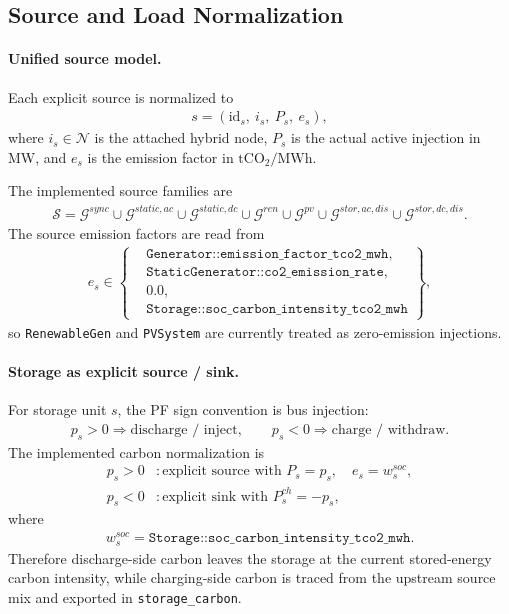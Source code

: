 \subsection{Source and Load Normalization}

\paragraph{Unified source model.}
Each explicit source is normalized to
\begin{align}
s = \left(\mathrm{id}_s,\ i_s,\ P_s,\ e_s\right),
\end{align}
where \(i_s \in \mathcal{N}\) is the attached hybrid node, \(P_s\) is the
actual active injection in MW, and \(e_s\) is the emission factor in
\(\mathrm{tCO_2/MWh}\).

The implemented source families are
\begin{align}
\mathcal{S} =
\mathcal{G}^{sync}
\cup \mathcal{G}^{static,ac}
\cup \mathcal{G}^{static,dc}
\cup \mathcal{G}^{ren}
\cup \mathcal{G}^{pv}
\cup \mathcal{G}^{stor,ac,dis}
\cup \mathcal{G}^{stor,dc,dis}.
\end{align}
The source emission factors are read from
\begin{align}
e_s \in
\left\{
\begin{aligned}
&\texttt{Generator::emission\_factor\_tco2\_mwh}, \\
&\texttt{StaticGenerator::co2\_emission\_rate}, \\
&0.0, \\
&\texttt{Storage::soc\_carbon\_intensity\_tco2\_mwh}
\end{aligned}
\right\},
\end{align}
so \texttt{RenewableGen} and \texttt{PVSystem} are currently treated as
zero-emission injections.

\paragraph{Storage as explicit source / sink.}
For storage unit \(s\), the PF sign convention is bus injection:
\begin{align}
p_s > 0 \Rightarrow \text{discharge / inject},\qquad
p_s < 0 \Rightarrow \text{charge / withdraw}.
\end{align}
The implemented carbon normalization is
\begin{align}
p_s > 0 &: \text{explicit source with } P_s = p_s,\quad e_s = w_s^{soc}, \\
p_s < 0 &: \text{explicit sink with } P_s^{ch} = -p_s,
\end{align}
where
\begin{align}
w_s^{soc} = \texttt{Storage::soc\_carbon\_intensity\_tco2\_mwh}.
\end{align}
Therefore discharge-side carbon leaves the storage at the current stored-energy
carbon intensity, while charging-side carbon is traced from the upstream source
mix and exported in \texttt{storage\_carbon}.

